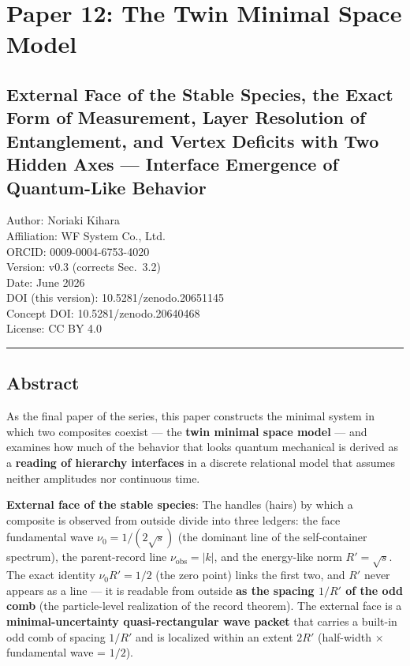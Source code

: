 \documentclass[
]{article}
\author{}
\date{}
\begin{document}
\section{Paper 12: The Twin Minimal Space
Model}\label{paper-12-the-twin-minimal-space-model}

\subsection{External Face of the Stable Species, the Exact Form of
Measurement, Layer Resolution of Entanglement, and Vertex Deficits with
Two Hidden Axes --- Interface Emergence of Quantum-Like
Behavior}\label{external-face-of-the-stable-species-the-exact-form-of-measurement-layer-resolution-of-entanglement-and-vertex-deficits-with-two-hidden-axes-interface-emergence-of-quantum-like-behavior}

Author: Noriaki Kihara\\
Affiliation: WF System Co., Ltd.\\
ORCID: 0009-0004-6753-4020\\
Version: v0.3 (corrects Sec.~3.2)\\
Date: June 2026\\
DOI (this version): 10.5281/zenodo.20651145\\
Concept DOI: 10.5281/zenodo.20640468\\
License: CC BY 4.0

\begin{center}\rule{0.5\linewidth}{0.5pt}\end{center}

\subsection{Abstract}\label{abstract}

As the final paper of the series, this paper constructs the minimal
system in which two composites coexist --- the \textbf{twin minimal
space model} --- and examines how much of the behavior that looks
quantum mechanical is derived as a \textbf{reading of hierarchy
interfaces} in a discrete relational model that assumes neither
amplitudes nor continuous time.

\textbf{External face of the stable species}: The handles (hairs) by
which a composite is observed from outside divide into three ledgers:
the face fundamental wave \(\nu_0=1/(2\sqrt s)\) (the dominant line of
the self-container spectrum), the parent-record line
\(\nu_{\mathrm{obs}}=|k|\), and the energy-like norm \(R'=\sqrt s\). The
exact identity \(\nu_0 R'=1/2\) (the zero point) links the first two,
and \(R'\) never appears as a line --- it is readable from outside
\textbf{as the spacing \(1/R'\) of the odd comb} (the particle-level
realization of the record theorem). The external face is a
\textbf{minimal-uncertainty quasi-rectangular wave packet} that carries
a built-in odd comb of spacing \(1/R'\) and is localized within an
extent \(2R'\) (half-width × fundamental wave = \(1/2\)).
\end{document}

